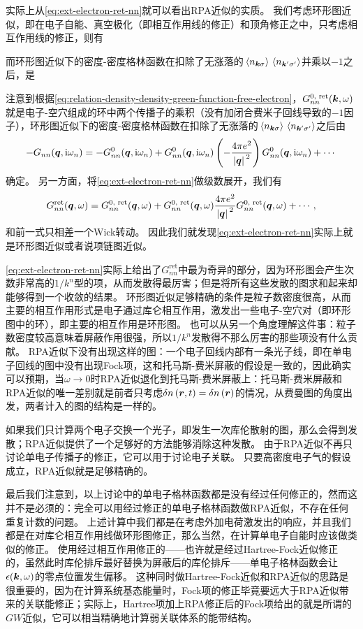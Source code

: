 实际上从\eqref{eq:ext-electron-ret-nn}就可以看出RPA近似的实质。
我们考虑环形图近似，即在电子自能、真空极化（即相互作用线的修正）和顶角修正之中，只考虑相互作用线的修正，则有

而环形图近似下的密度-密度格林函数在扣除了无涨落的$\expval*{n_{\vb*{k} \sigma}} \expval*{n_{\vb*{k}' \sigma'}}$并乘以$-1$之后，是

注意到根据\eqref{eq:relation-density-density-green-function-free-electron}，$G^\text{0, ret}_{nn}(\vb*{k}, \omega)$就是电子-空穴组成的环中两个传播子的乘积（没有加闭合费米子回线导致的$-1$因子），环形图近似下的密度-密度格林函数在扣除了无涨落的$\expval*{n_{\vb*{k} \sigma}} \expval*{n_{\vb*{k}' \sigma'}}$之后由
\[
    - G_{nn}(\vb*{q}, \mathrm{i} \omega_n) = - G_{nn}^0(\vb*{q}, \mathrm{i} \omega_n) + G_{nn}^0(\vb*{q}, \mathrm{i} \omega_n) \left( - \frac{4 \pi e^2}{\abs*{\vb*{q}}^2} \right) G_{nn}^0(\vb*{q}, \mathrm{i} \omega_n) + \cdots
\]
确定。
另一方面，将\eqref{eq:ext-electron-ret-nn}做级数展开，我们有
\[
    G^\text{ret}_{nn}(\vb*{q}, \omega) = G^\text{0, ret}_{nn}(\vb*{q}, \omega) + G^\text{0, ret}_{nn}(\vb*{q}, \omega) \frac{4\pi e^2}{\abs*{\vb*{q}}^2} G^\text{0, ret}_{nn}(\vb*{q}, \omega) + \cdots,
\]
和前一式只相差一个Wick转动。
因此我们就发现\eqref{eq:ext-electron-ret-nn}实际上就是环形图近似或者说项链图近似。

\eqref{eq:ext-electron-ret-nn}实际上给出了$G^\text{ret}_{nn}$中最为奇异的部分，因为环形图会产生次数非常高的$1/k^n$型的项，从而发散得最厉害；但是将所有这些发散的图求和起来却能够得到一个收敛的结果。
环形图近似足够精确的条件是粒子数密度很高，从而主要的相互作用形式是电子通过库仑相互作用，激发出一些电子-空穴对（即环形图中的环），即主要的相互作用是环形图。
也可以从另一个角度理解这件事：粒子数密度较高意味着屏蔽作用很强，所以$1/k^n$发散得不那么厉害的那些项没有什么贡献。
RPA近似下没有出现这样的图：一个电子回线内部有一条光子线，即在单电子回线的图中没有出现Fock项，这和托马斯-费米屏蔽的假设是一致的，因此确实可以预期，当$\omega \to 0$时RPA近似退化到托马斯-费米屏蔽上：托马斯-费米屏蔽和RPA近似的唯一差别就是前者只考虑$\var{n}(\vb*{r}, t) = \var{n}(\vb*{r})$的情况，从费曼图的角度出发，两者计入的图的结构是一样的。

如果我们只计算两个电子交换一个光子，即发生一次库伦散射的图，那么会得到发散；RPA近似提供了一个足够好的方法能够消除这种发散。
由于RPA近似不再只讨论单电子传播子的修正，它可以用于讨论电子关联。
只要高密度电子气的假设成立，RPA近似就是足够精确的。

最后我们注意到，以上讨论中的单电子格林函数都是没有经过任何修正的，然而这并不是必须的：完全可以用经过修正的单电子格林函数做RPA近似，不存在任何重复计数的问题。
上述计算中我们都是在考虑外加电荷激发出的响应，并且我们都是在对库仑相互作用线做环形图修正，那么当然，在计算单电子自能时应该做类似的修正。
使用经过相互作用修正的——也许就是经过Hartree-Fock近似修正的，虽然此时库伦排斥最好替换为屏蔽后的库伦排斥——单电子格林函数会让$\epsilon(\vb*{k}, \omega)$的零点位置发生偏移。
这种同时做Hartree-Fock近似和RPA近似的思路是很重要的，因为在计算系统基态能量时，Fock项的修正毕竟要远大于RPA近似带来的关联能修正；实际上，Hartree项加上RPA修正后的Fock项给出的就是所谓的$GW$近似，它可以相当精确地计算弱关联体系的能带结构。

